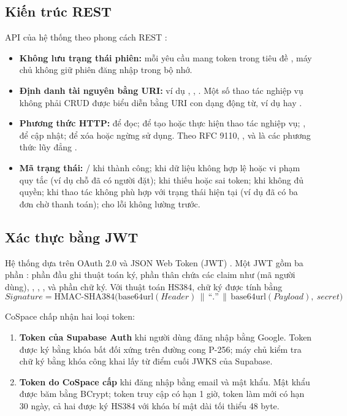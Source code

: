 \subsection{Kiến trúc REST}
API của hệ thống theo phong cách REST \cite{fielding2000rest}:
\begin{itemize}
    \item \textbf{Không lưu trạng thái phiên:} mỗi yêu cầu mang token trong tiêu đề , máy chủ không giữ phiên đăng nhập trong bộ nhớ.
    \item \textbf{Định danh tài nguyên bằng URI:} ví dụ , , . Một số thao tác nghiệp vụ không phải CRUD được biểu diễn bằng URI con dạng động từ, ví dụ  hay .
    \item \textbf{Phương thức HTTP:}  để đọc;  để tạo hoặc thực hiện thao tác nghiệp vụ; ,  để cập nhật;  để xóa hoặc ngừng sử dụng. Theo RFC 9110, ,  và  là các phương thức lũy đẳng \cite{rfc9110}.
    \item \textbf{Mã trạng thái:} / khi thành công;  khi dữ liệu không hợp lệ hoặc vi phạm quy tắc (ví dụ chỗ đã có người đặt);  khi thiếu hoặc sai token;  khi không đủ quyền;  khi thao tác không phù hợp với trạng thái hiện tại (ví dụ đã có ba đơn chờ thanh toán);  cho lỗi không lường trước.
\end{itemize}

\subsection{Xác thực bằng JWT}
Hệ thống dựa trên OAuth 2.0 \cite{rfc6749} và JSON Web Token (JWT) \cite{rfc7519}. Một JWT gồm ba phần : phần đầu ghi thuật toán ký, phần thân chứa các claim như  (mã người dùng), , , , và phần chữ ký. Với thuật toán HS384, chữ ký được tính bằng
\begin{equation}
    Signature = \text{HMAC-SHA384}\big(\text{base64url}(Header) \,\|\, \text{``.''} \,\|\, \text{base64url}(Payload),\ secret\big)
    \label{eq:jwt}
\end{equation}

CoSpace chấp nhận hai loại token:
\begin{enumerate}
    \item \textbf{Token của Supabase Auth} khi người dùng đăng nhập bằng Google. Token được ký bằng khóa bất đối xứng trên đường cong P-256; máy chủ kiểm tra chữ ký bằng khóa công khai lấy từ điểm cuối JWKS của Supabase.
    \item \textbf{Token do CoSpace cấp} khi đăng nhập bằng email và mật khẩu. Mật khẩu được băm bằng BCrypt; token truy cập có hạn 1 giờ, token làm mới có hạn 30 ngày, cả hai được ký HS384 với khóa bí mật dài tối thiểu 48 byte.
\end{enumerate}


